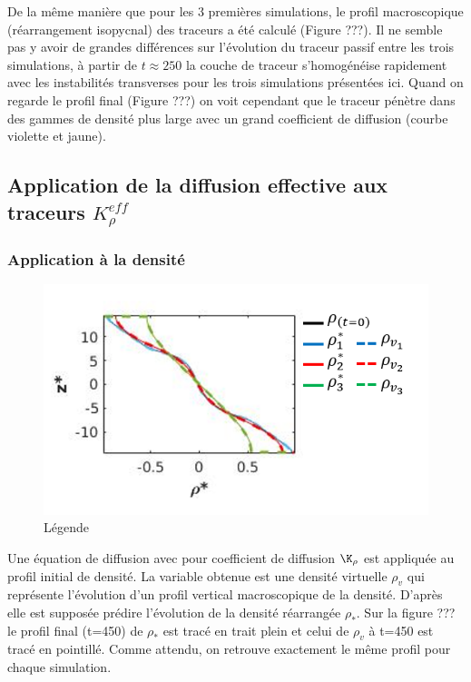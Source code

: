 \documentclass[a4paper,12pt]{article}
\begin{document}
    De la même manière que pour les 3 premières simulations, le profil macroscopique (réarrangement isopycnal) des traceurs a été calculé (Figure ???). Il ne semble pas y avoir de grandes différences sur l'évolution du traceur passif entre les trois simulations, à partir de $t\approx250$ la couche de traceur s'homogénéise rapidement avec les instabilités transverses pour les trois simulations présentées ici. Quand on regarde le profil final (Figure ???) on voit cependant que le traceur pénètre dans des gammes de densité plus large avec un grand coefficient de diffusion (courbe violette et jaune).
    
  \subsection{Application de la diffusion effective aux traceurs $K_{\rho}^{eff}$}
  
    \subsubsection{Application à la densité}
    \begin{figure}[!h]
            \centering
            \label{scatterplot_phi}
            \includegraphics[width=0.5\linewidth]{figures/profils_Krho_rho.png}
            \caption{Légende}
    \end{figure}
    
    Une équation de diffusion avec pour coefficient de diffusion $\K_\rho$ est appliquée au profil initial de densité. La variable obtenue est une densité virtuelle $\rho_v$ qui représente l'évolution d'un profil vertical macroscopique de la densité. D'après \cite{penney_diapycnal_2020} elle est supposée prédire l'évolution de la densité réarrangée $\rho_*$. Sur la figure ??? le profil final (t=450) de $\rho_*$ est tracé en trait plein et celui de $\rho_v$ à t=450 est tracé en pointillé. Comme attendu, on retrouve exactement le même profil pour chaque simulation.
    
\end{document}
